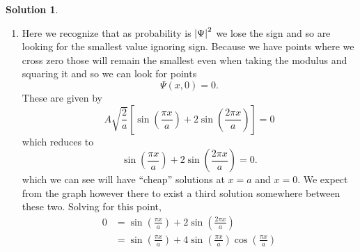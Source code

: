 \documentclass[10pt]{article}
\theoremstyle{definition}
\newtheorem{soln}{Solution}
\begin{document}
\begin{soln}
\begin{enumerate}[label=(\alph*)]
\begin{align*}
              & =\cos\left(\frac{\pi x}{a}\right)+4cos^2\left(\frac{\pi x}{a}\right)-4+4cos^2\left(\frac{\pi x}{a}\right)                          \\
              & =8s^2+s-4\implies \cos\left(\frac{\pi x}{a}\right)=\frac{-1\pm\sqrt{129}}{16}                                                      \\
              & \implies x =\begin{cases}
                              \frac{a}{\pi}\arccos\left(\frac{-1+\sqrt{129}}{16}\right)+2k\pi   \\
                              -\frac{a}{\pi}\arccos\left(\frac{-1+\sqrt{129}}{16}\right)+2k\pi  \\
                              a-\frac{a}{\pi}\arccos\left(\frac{-1-\sqrt{129}}{16}\right)+2k\pi \\
                              -a+\frac{a}{\pi}\arccos\left(\frac{-1-\sqrt{129}}{16}\right)+2k\pi
                            \end{cases} k\in \mathbb{Z}
          \end{align*}
          Here the $$\frac{a}{\pi}\arccos\left(\frac{-1+\sqrt{129}}{16}\right)$$
          solution gives us the value we want, $\approx 0.276$ for $a=1$. See the blue mark on the plot for
          where this point lies.
    \item Here we recognize that as probability is $\abs{\Psi}^2$ we lose the sign and so are looking for the smallest value ignoring sign. Because we have
          points where we cross zero those will remain the smallest even when taking the modulus and squaring it and so we can look for points
          $$\Psi(x,0)=0.$$
          These are given by
          $$A\sqrt{\frac{2}{a}}\left[\sin\left(\frac{\pi x}{a}\right)+2\sin\left(\frac{2\pi x}{a}\right)\right]=0$$
          which reduces to
          $$\sin\left(\frac{\pi x}{a}\right)+2\sin\left(\frac{2\pi x}{a}\right)=0.$$
          which we can see will have ``cheap'' solutions at $x=a$ and $x=0$. We expect from the graph however there to exist a third solution somewhere between
          these two. Solving for this point,
          \begin{align*}
            0 & =\sin\left(\frac{\pi x}{a}\right)+2\sin\left(\frac{2\pi x}{a}\right)                                                           \\
              & =\sin\left(\frac{\pi x}{a}\right)+4\sin\left(\frac{\pi x}{a}\right)\cos\left(\frac{\pi x}{a}\right)                            \\

\end{align*}
\end{enumerate}
\end{soln}
\end{document}
